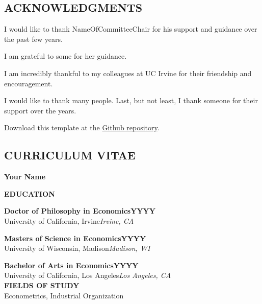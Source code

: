 \documentclass[letterpaper]{report}
\begin{document}
\doublespacing
\newpage
\begin{center}
  \section*{ACKNOWLEDGMENTS}
\end{center}

I would like to thank NameOfCommitteeChair for his support and guidance over the past few years.

I am grateful to some for her guidance.

I am incredibly thankful to my colleagues at UC Irvine for their friendship and encouragement.

I would like to thank many people. Last, but not least, I thank someone for their support over the years.

Download this template at the \href{https://github.com/howardhsumail/Dissertation-Template.git}{Github repository}.


\newpage
\begin{center}
  \section*{CURRICULUM VITAE}
  
  {\fontsize{12}{12}\selectfont
  \textbf{Your Name}
  }
\end{center}

\textbf{EDUCATION}

\textbf{Doctor of Philosophy in Economics\hfill YYYY}\\[-0.2cm]
University of California, Irvine\hfill \textit{Irvine, CA}

\textbf{Masters of Science in Economics\hfill YYYY}\\[-0.2cm]
University of Wisconsin, Madison\hfill \textit{Madison, WI}

\textbf{Bachelor of Arts in Economics\hfill YYYY}\\[-0.2cm]
University of California, Los Angeles\hfill \textit{Los Angeles, CA}\\

\textbf{FIELDS OF STUDY}\\
Econometrics, Industrial Organization
\end{document}
